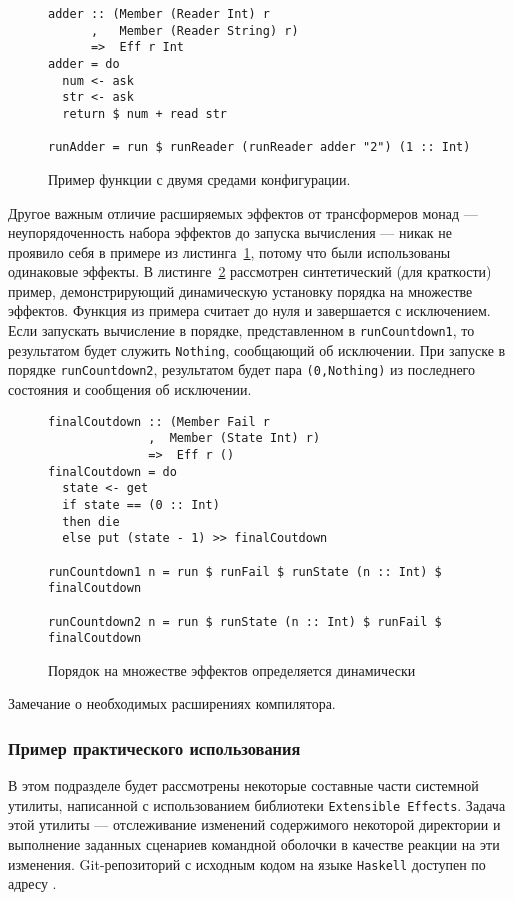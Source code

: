 \begin{figure}[t]
\begin{lstlisting}
adder :: (Member (Reader Int) r
      ,   Member (Reader String) r) 
      =>  Eff r Int
adder = do
  num <- ask
  str <- ask
  return $ num + read str

runAdder = run $ runReader (runReader adder "2") (1 :: Int)
\end{lstlisting}
\caption{Пример функции с двумя средами конфигурации.}
\label{listing:extEff2Readers}
\end{figure} 

Другое важным отличие расширяемых эффектов от трансформеров монад --- неупорядоченность набора эффектов до запуска вычисления --- никак не проявило себя в примере из листинга~\ref{listing:extEff2Readers}, потому что были использованы одинаковые эффекты. В листинге~\ref{listing:extEffOrdering} рассмотрен синтетический (для краткости) пример, демонстрирующий динамическую установку порядка на множестве эффектов. Функция из примера считает до нуля и завершается с исключением. Если запускать вычисление в порядке, представленном в \lstinline{runCountdown1}, то результатом будет служить \lstinline{Nothing}, сообщающий об исключении. При запуске в порядке \lstinline{runCountdown2}, результатом будет пара \lstinline{(0,Nothing)} из последнего состояния и сообщения об исключении.      

\begin{figure}[t]
\begin{lstlisting}
finalCoutdown :: (Member Fail r
              ,  Member (State Int) r)
              =>  Eff r ()
finalCoutdown = do
  state <- get
  if state == (0 :: Int) 
  then die
  else put (state - 1) >> finalCoutdown 

runCountdown1 n = run $ runFail $ runState (n :: Int) $ finalCoutdown

runCountdown2 n = run $ runState (n :: Int) $ runFail $ finalCoutdown
\end{lstlisting}
\caption{Порядок на множестве эффектов определяется динамически}
\label{listing:extEffOrdering}
\end{figure} 

Замечание о необходимых расширениях компилятора.

\subsubsection{Пример практического использования}

В этом подразделе будет рассмотрены некоторые составные части системной утилиты, написанной с использованием библиотеки \lstinline{Extensible Effects}. Задача этой утилиты --- отслеживание изменений содержимого некоторой директории и выполнение заданных сценариев командной оболочки в качестве реакции на эти изменения. Git-репозиторий с исходным кодом на языке \lstinline{Haskell} доступен по адресу \autocite{FileTrigger}. 

